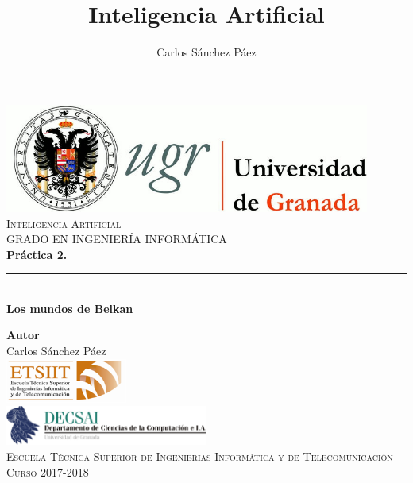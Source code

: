 \documentclass[12pt,spanish]{article}
\title{Inteligencia Artificial}
\author{Carlos Sánchez Páez}
\begin{document}
\begin{titlepage}

\newlength{\centeroffset}
\setlength{\centeroffset}{-0.5\oddsidemargin}
\addtolength{\centeroffset}{0.5\evensidemargin}
\thispagestyle{empty}

\noindent\hspace*{\centeroffset}
\begin{minipage}{\textwidth}

\centering
\includegraphics[width=0.9\textwidth]{logo_ugr.jpg}\\[1.4cm]

\textsc{ \Large Inteligencia Artificial\\[0.2cm]}
\textsc{GRADO EN INGENIERÍA INFORMÁTICA}\\[1cm]

{\Huge\bfseries Práctica 2.\\
}
\noindent\rule[-1ex]{\textwidth}{3pt}\\[3.5ex]
{\large\bfseries Los mundos de Belkan}
\end{minipage}

\vspace{1.5cm}
\noindent\hspace*{\centeroffset}
\begin{minipage}{\textwidth}
\centering

\textbf{Autor}\\ {Carlos Sánchez Páez}\\[2.5ex]
\includegraphics[width=0.3\textwidth]{etsiit_logo.png}\\[0.1cm]
\vspace{1.5cm}
\includegraphics[width=0.5\textwidth]{decsai.jpg}\\[0.1cm]
\vspace{1cm}
\textsc{Escuela Técnica Superior de Ingenierías Informática y de Telecomunicación}\\
\vspace{1cm}
\textsc{Curso 2017-2018}
\end{minipage}
\end{titlepage}
\thispagestyle{empty}
\newpage
\tableofcontents{}
\newpage
\thispagestyle{empty}
\end{document}
